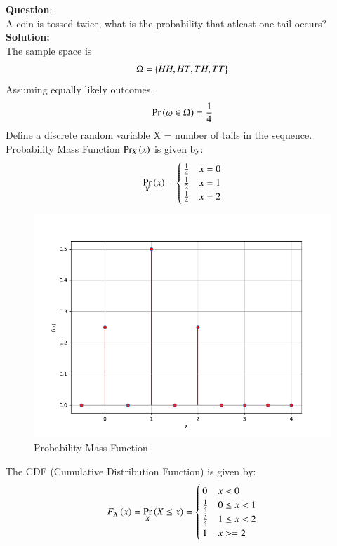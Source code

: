 \documentclass[journal]{IEEEtran}
\begin{document}
\textbf{Question}:\\
A coin is tossed twice, what is the probability that atleast one tail occurs?
\\
\textbf{Solution: }\\
The sample space is 
\begin{align}
  \Omega = \left\{HH, HT, TH, TT\right\}
\end{align}
Assuming equally likely outcomes, 
\begin{align}
  \Pr\left(\omega \in \Omega\right) = \frac{1}{4}
\end{align}
Define a discrete random variable X = number of tails in the sequence.
\newline
Probability Mass Function $\Pr_{X}\left(x\right)$ is given by:
\begin{align}
  \Pr_{X}\left(x\right) = \begin{cases}
\frac{1}{4} & x = 0\\
    \frac{1}{2} & x = 1\\
    \frac{1}{4} & x = 2\\
\end{cases}
\end{align}
\begin{figure}[h!]
   \centering
   \includegraphics[width=0.7\columnwidth]{figs/fig1.png}
    \caption{Probability Mass Function}
\end{figure}
The CDF (Cumulative Distribution Function) is given by:
\begin{align}
  F_{X}\left(x\right) = \Pr_X\left(X \le x\right) = \begin{cases}
    0 & x < 0\\
    \frac{1}{4} & 0 \le x < 1\\
    \frac{3}{4} & 1 \le x < 2\\
    1 & x >=2
  \end{cases}
\end{align}
\end{document}
